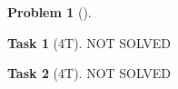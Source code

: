 \documentclass[11pt,twoside]{article}
\theoremstyle{definition}
\newtheorem{amsproblem}{Problem}
\newtheorem{amssubproblem}{Task}[amsproblem]
\newenvironment{problem}[1][]{%
  \begin{amsproblem}[#1]
  }{%
  \end{amsproblem}
}
\newenvironment{subproblem}[1][]{%
  \begin{amssubproblem}[#1]
  }{%
  \end{amssubproblem}
}
\newcommand{\TP}[1]{#1T}
\begin{document}
\noindent
\hrulefill

\begin{problem}
  \begin{subproblem}[\TP{4}]
    NOT SOLVED %
  \end{subproblem}
  \begin{subproblem}[\TP{4}]
    NOT SOLVED %
  \end{subproblem}
\end{problem}

\noindent
\hrulefill
\end{document}
